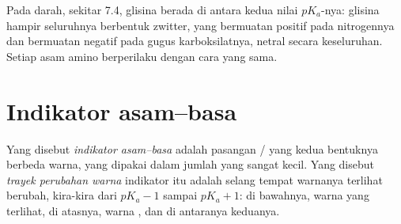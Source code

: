 \begin{example}\label{ex:g12:buffers-predominance:glycine}
Pada  darah, sekitar 7.4, glisina berada di antara kedua nilai
$pK_a$-nya: glisina hampir seluruhnya berbentuk  zwitter, yang
bermuatan positif pada nitrogennya dan bermuatan negatif pada gugus
karboksilatnya, netral secara keseluruhan. Setiap asam amino berperilaku
dengan cara yang sama.
\end{example}

\section{Indikator asam--basa}


\begin{definition}\label{def:g12:buffers-predominance:indicator}
Yang disebut \emph{indikator asam--basa}
adalah pasangan / yang kedua bentuknya berbeda
warna, yang dipakai dalam jumlah yang sangat kecil.
Yang disebut \emph{trayek perubahan warna}
indikator itu adalah selang  tempat warnanya terlihat berubah, kira-kira dari $pK_a - 1$
sampai $pK_a + 1$: di bawahnya, warna  yang terlihat, di
atasnya, warna , dan di antaranya  keduanya.
\end{definition}

